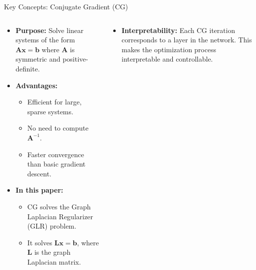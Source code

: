 \documentclass[aspectratio=169,xcolor=dvipsnames]{beamer}
\begin{document}
\begin{frame}{Key Concepts: Conjugate Gradient (CG)}

\begin{columns}[c]

\begin{column}{0.5\textwidth}

\begin{itemize}

    \item \textbf{Purpose:}  
    Solve linear systems of the form  
    $\mathbf{A} \mathbf{x} = \mathbf{b}$  
    where $\mathbf{A}$ is symmetric and positive-definite.

    \vspace{0.3cm}

    \item \textbf{Advantages:}  
    \begin{itemize}
        \item Efficient for large, sparse systems.
        \item No need to compute $\mathbf{A}^{-1}$.
        \item Faster convergence than basic gradient descent.
    \end{itemize}

    \vspace{0.3cm}

    \item \textbf{In this paper:}  
    \begin{itemize}
        \item CG solves the Graph Laplacian Regularizer (GLR) problem.
        \item It solves $\mathbf{L} \mathbf{x} = \mathbf{b}$,  
        where $\mathbf{L}$ is the graph Laplacian matrix.
    \end{itemize}

    \vspace{0.3cm}
\end{itemize}
\end{column}

\begin{column}{0.5\textwidth}
\begin{itemize}
    \item \textbf{Interpretability:}  
    Each CG iteration corresponds to a layer in the network.  
    This makes the optimization process interpretable and controllable.

\end{itemize}


\end{column}
\end{columns}
\end{frame}
\end{document}
